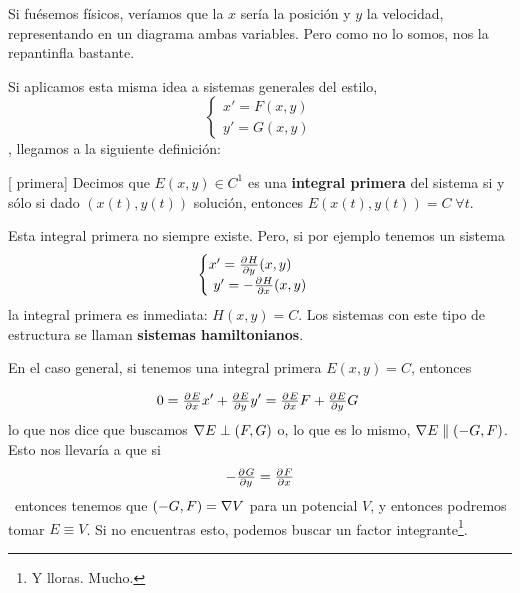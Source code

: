 Si fuésemos físicos, veríamos que la $x$ sería la posición y $y$ la velocidad, representando en un diagrama ambas variables. Pero como no lo somos, nos la repantinfla bastante.


Si aplicamos esta misma idea a sistemas generales del estilo, \[ \begin{cases} x' = F(x,y) \\ y' = G(x,y) \end{cases} \], llegamos a la siguiente definición:

\begin{definition}[ primera] Decimos que $E(x,y) ∈ C^1$ es una \textbf{integral primera} del sistema si y sólo si dado $(x(t),y(t))$ solución, entonces $E(x(t),y(t)) = C\;∀t$.
\end{definition} 

Esta integral primera no siempre existe. Pero, si por ejemplo tenemos un sistema \[ \begin{cases} x' = \pd{H}{y}(x,y) \\ y' = -\pd{H}{x}(x,y) \end{cases} \] la integral primera es inmediata: $H(x,y) = C$. Los sistemas con este tipo de estructura se llaman \textbf{sistemas hamiltonianos}.

En el caso general, si tenemos una integral primera $E(x,y) = C$, entonces

\[ 0 = \pd{E}{x}x' + \pd{E}{y} y' = \pd{E}{x}F + \pd{E}{y} G 
\] 
lo que nos dice que buscamos $\nabla E \perp (F,G)$ o, lo que es lo mismo, $\nabla E \parallel (-G,F)$. Esto nos llevaría a que si \[ -\pd{G}{y} = \pd{F}{x}\] entonces tenemos que $(-G,F) = \nabla V$ para un potencial $V$, y entonces podremos tomar $E\equiv V$. Si no encuentras esto, podemos buscar un factor integrante\footnote{Y lloras. Mucho.}.

